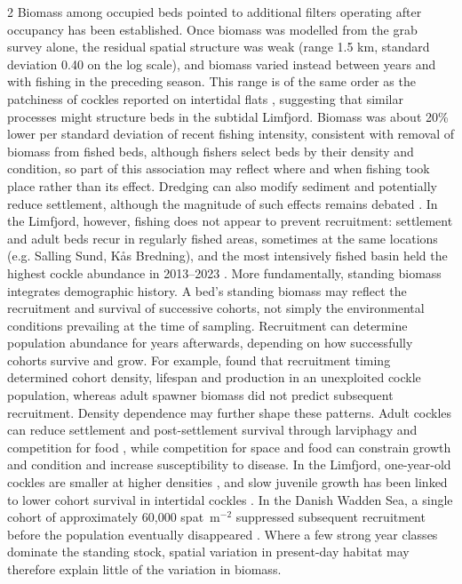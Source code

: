 \begin{spacing}{2}
Biomass among occupied beds pointed to additional filters operating after occupancy has been established. Once biomass was modelled from the grab survey alone, the residual spatial structure was weak (range 1.5 km, standard deviation 0.40 on the log scale), and biomass varied instead between years and with fishing in the preceding season. This range is of the same order as the patchiness of cockles reported on intertidal flats  \citep{kraanPatchinessMacrobenthicInvertebrates2009}, suggesting that similar processes might structure beds in the subtidal Limfjord. Biomass was about 20\% lower per standard deviation of recent fishing intensity, consistent with removal of biomass from fished beds, although fishers select beds by their density and condition, so part of this association may reflect where and when fishing took place rather than its effect. Dredging can also modify sediment and potentially reduce settlement, although the magnitude of such effects remains debated \citep{piersmaLongtermIndirectEffects2001, vandermeerReevaluationEffectsMechanical2023}. In the Limfjord, however, fishing does not appear to prevent recruitment: settlement and adult beds recur in regularly fished areas, sometimes at the same locations (e.g. Salling Sund, K\aa{}s Bredning), and the most intensively fished basin held the highest cockle abundance in 2013–2023 \citep{freitasSustainableCockleFishery2023}. More fundamentally, standing biomass integrates demographic history. A bed’s standing biomass may reflect the recruitment and survival of successive cohorts, not simply the environmental conditions prevailing at the time of sampling. Recruitment can determine population abundance for years afterwards, depending on how successfully cohorts survive and grow. For example, \citet{magalhaesCocklePopulationDynamics2016} found that recruitment timing determined cohort density, lifespan and production in an unexploited cockle population, whereas adult spawner biomass did not predict subsequent recruitment. Density dependence may further shape these patterns. Adult cockles can reduce settlement and post-settlement survival through larviphagy and competition for food \citep{malhamReviewBiologyEuropean2012}, while competition for space and food can constrain growth and condition and increase susceptibility to disease. In the Limfjord, one-year-old cockles are smaller at higher densities \citep{Freitas2024}, and slow juvenile growth has been linked to lower cohort survival in intertidal cockles \citep{montaudouinJuvenileGrowthDeficit2021}. In the Danish Wadden Sea, a single cohort of approximately 60{,}000 spat~m$^{-2}$ suppressed subsequent recruitment  before the population eventually disappeared \citep{f46a34c986624a1baee20a526e50e3c9}. Where a few strong year classes dominate the standing stock, spatial variation in present-day habitat may therefore explain little of the variation in biomass.


\end{spacing}
